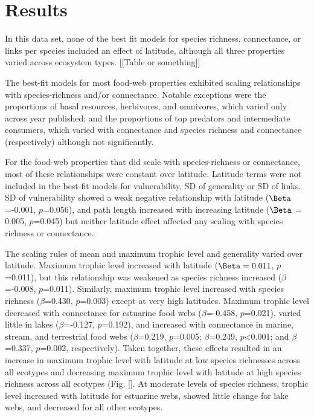 \section*{Results}

In this data set, none of the best fit models for species richness, connectance, or links per species included an 
effect of latitude, although all three properties varied across ecosystem types. [[Table or something]]


The best-fit models for most food-web properties exhibited scaling relationships with species-richness and/or 
connectance. Notable exceptions were the proportions of basal resources, herbivores, and omnivores, which varied only 
across year published; and the proportions of top predators and intermediate consumers, which varied with connectance 
and species richness and connectance (respectively) although not significantly.


For the food-web properties that did scale with species-richness or connectance, most of these relationships were 
constant over latitude. Latitude terms were not included in the best-fit models for vulnerability, SD of generality or 
SD of links. SD of vulnerability showed a weak negative relationship with latitude ($\Beta$=-0.001, $p$=0.056), 
and path length increased with increasing 
latitude ($\Beta$ = 0.005, $p$=0.045) but neither latitude effect affected any scaling with species richness or 
connectance.


The scaling rules of mean and maximum trophic level and generality varied over latitude. 
Maximum trophic level increased with 
latitude ($\Beta=0.011$, $p$=0.011), but this relationship was weakened as species richness increased ($\beta$=-0.008, $
p$=0.011). Similarly, maximum trophic level increased with species richness ($\beta$=0.430, $p$=0.003) except at very 
high latitudes. Maximum trophic level decreased with connectance for estuarine food webs ($\beta$=-0.458, $p$=0.021), 
varied little in lakes ($\beta$=-0.127, $p$=0.192), and increased with connectance in marine, stream, and terrestrial 
food webs ($\beta$=0.219, $p$=0.005; $\beta$=0.249, $p$<0.001; and $\beta$=0.337, $p$=0.002, respectively). Taken 
together, these effects resulted in an increase in maximum trophic level with latitude at low species richnesses across 
all ecotypes and decreasing maximum trophic level with latitude at high species richness across all ecotypes 
(Fig. \ref{}. At moderate levels of species richness, trophic level increased with latitude for estuarine webs, showed 
little change for lake webs, and decreased for all other ecotypes. 


